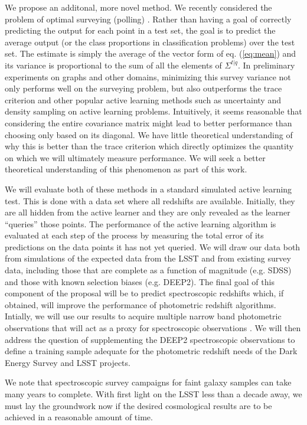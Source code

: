 \documentclass[prd, nofootinbib, floatfix, 12pt,tightenlines]{revtex4}
\begin{document}
We propose an additonal, more novel method.  We recently considered the
problem of optimal surveying (polling) \cite{Garnett12}.  Rather than
having a goal of correctly predicting the output for each point in a test
set, the goal is to predict the average output (or the class proportions in
classification problems) over the test set.  The estimate is simply the
average of the vector form of eq. (\ref{eq:mean}) and its variance is
proportional to the sum of all the elements of $\Sigma^{t|q}$.  In
preliminary experiments on graphs and other domains, minimizing this survey
variance not only performs well on the surveying problem, but also
outperforms the trace criterion and other popular active learning methods
such as uncertainty and density sampling \cite{activelearning} on active
learning problems.  Intuitively, it seems reasonable that considering the
entire covariance matrix might lead to better performance than choosing
only based on its diagonal.  We have little theoretical understanding of
why this is better than the trace criterion which directly optimizes the
quantity on which we will ultimately measure performance.  We will seek a
better theoretical understanding of this phenomenon as part of this work.

We will evaluate both of these methods in a standard simulated active
learning test.  This is done with a data set where all redshifts are
available.  Initially, they are all hidden from the active learner and they
are only revealed as the learner ``queries'' those points.  The performance
of the active learning algorithm is evaluated at each step of the process
by measuring the total error of its predictions on the data points it has
not yet queried.  We will draw our data both from simulations of the expected
data from the LSST \cite{imsim} and from existing survey data,
including those that are complete as a function of magnitude (e.g. SDSS) and
those with known selection biases (e.g. DEEP2).  The final goal of this
component of the proposal will be to predict spectroscopic
redshifts which, if obtained, will
improve the performance of photometric redshift algorithms.  Intially, we will
use our results to acquire multiple narrow band photometric observations that
will act as a proxy for spectroscopic observations \cite{narrow}.
We will then address the question of supplementing the DEEP2 
spectroscopic observations to
define a training sample adequate for the photometric redshift needs of the Dark
Energy Survey and LSST projects.


We note that spectroscopic survey campaigns for faint galaxy samples
can take many years to complete.  With first light on the LSST less
than a decade away, we must lay the groundwork now if the desired
cosmological results are to be achieved in a reasonable amount of
time.
\end{document}
